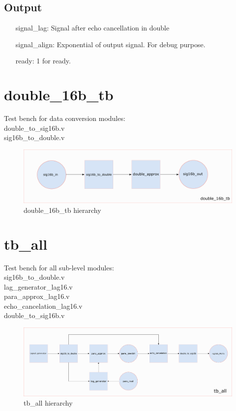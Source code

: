 \documentclass[twoside,a4paper]{refart}
\begin{document}
\subsection{Output}
\begin{itemize}
	\item[signal\_lag:] Signal after echo cancellation in double
	\item[signal\_align:] Exponential of output signal. For debug purpose.
	\item[ready:] 1 for ready.
\end{itemize}
\section{double\_16b\_tb}
Test bench for data conversion modules:\\
double\_to\_sig16b.v\\
sig16b\_to\_double.v\\
\begin{figure}[H]
	\centering
	\includegraphics[scale=1]{double_16b_tb.png}
	\caption{double\_16b\_tb hierarchy}
	\label{}
\end{figure}
\section{tb\_all}
Test bench for all sub-level modules:\\
sig16b\_to\_double.v\\
lag\_generator\_lag16.v\\
para\_approx\_lag16.v\\
echo\_cancelation\_lag16.v\\
double\_to\_sig16b.v\\
\begin{figure}[H]
	\centering
	\includegraphics[scale=0.6]{tb_all.png}
	\caption{tb\_all hierarchy}
	\label{}
\end{figure}
\end{document}
